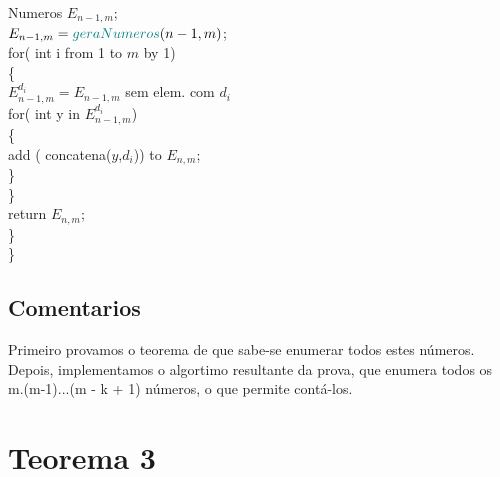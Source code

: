\documentclass[twoside]{article}
\begin{document}
\begin{multicols}{2}
\hspace*{10mm} {\color[rgb]{0,0,1} Numeros} $E_{n-1,m}$;\\
\hspace*{10mm} $E_{n-1,m} = {\color[rgb]{0,0.5,0.5} geraNumeros}(n-1,m)$;\\
\hspace*{10mm} {\color[rgb]{0.7,0.3,0} for}({\color[rgb]{0,0,1} int} i {\color[rgb]{0.7,0.3,0} from} 1 {\color[rgb]{0.7,0.3,0} to} $m$ {\color[rgb]{0.7,0.3,0} by} 1)\\
\hspace*{10mm} \{\\
\hspace*{15mm} $E_{n-1,m}^{d_i} = E_{n-1,m}$ {\color[rgb]{0,0.5,0.5}sem elem. com} $d_i$\\
\hspace*{15mm} {\color[rgb]{0.7,0.3,0} for}({\color[rgb]{0,0,1} int} y {\color[rgb]{0.7,0.3,0} in} $E_{n-1,m}^{d_i}$)\\
\hspace*{15mm} \{\\
\hspace*{20mm} {\color[rgb]{0,0.5,0.5} add} ({\color[rgb]{0,0.5,0.5} concatena}($y$,$d_i$)) {\color[rgb]{0,0.5,0.5} to} $E_{n,m}$;\\
\hspace*{15mm} \}\\
\hspace*{10mm} \}\\
\hspace*{10mm} {\color[rgb]{0.5,0,1} return}  $E_{n,m}$;\\
\hspace*{5mm} \}\\
\}\\

\subsection{ Comentarios }
\indent  Primeiro provamos o teorema de que sabe-se enumerar todos estes números.
Depois, implementamos o algortimo resultante da prova, que enumera todos os m.(m-1)...(m - k + 1) números, o que permite contá-los.\\



\section{Teorema 3}


\end{multicols}
\end{document}
